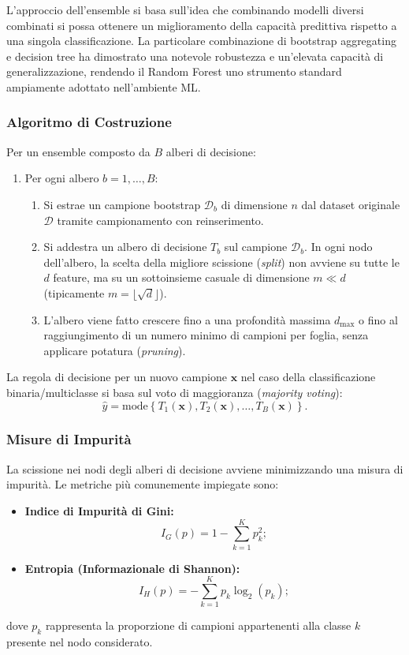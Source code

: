 L'approccio dell'ensemble si basa sull'idea che combinando modelli diversi combinati si possa ottenere un miglioramento della capacità predittiva rispetto a una singola classificazione. La particolare combinazione di bootstrap aggregating e decision tree ha dimostrato una notevole robustezza e un'elevata capacità di generalizzazione, rendendo il Random Forest uno strumento standard ampiamente adottato nell'ambiente ML.

\subsubsection{Algoritmo di Costruzione}
Per un ensemble composto da $B$ alberi di decisione:
\begin{enumerate}
    \item Per ogni albero $b = 1, \dots, B$:
    \begin{enumerate}
        \item Si estrae un campione bootstrap $\mathcal{D}_b$ di dimensione $n$ dal dataset originale $\mathcal{D}$ tramite campionamento con reinserimento.
        \item Si addestra un albero di decisione $T_b$ sul campione $\mathcal{D}_b$. In ogni nodo dell'albero, la scelta della migliore scissione (\textit{split}) non avviene su tutte le $d$ feature, ma su un sottoinsieme casuale di dimensione $m \ll d$ (tipicamente $m = \lfloor\sqrt{d}\rfloor$).
        \item L'albero viene fatto crescere fino a una profondità massima $d_{\max}$ o fino al raggiungimento di un numero minimo di campioni per foglia, senza applicare potatura (\textit{pruning}).
    \end{enumerate}
\end{enumerate}

La regola di decisione per un nuovo campione $\mathbf{x}$ nel caso della classificazione binaria/multiclasse si basa sul voto di maggioranza (\textit{majority voting}):
\begin{equation}
\hat{y} = \text{mode} \left\{ T_1(\mathbf{x}), T_2(\mathbf{x}), \dots, T_B(\mathbf{x}) \right\}.
\end{equation}

\subsubsection{Misure di Impurità}
La scissione nei nodi degli alberi di decisione avviene minimizzando una misura di impurità. Le metriche più comunemente impiegate sono:
\begin{itemize}
    \item \textbf{Indice di Impurità di Gini:}
    \begin{equation}
    I_G(p) = 1 - \sum_{k=1}^{K} p_k^2;
    \end{equation}
    \item \textbf{Entropia (Informazionale di Shannon):}
    \begin{equation}
    I_H(p) = -\sum_{k=1}^{K} p_k \log_2(p_k);
    \end{equation}
\end{itemize}
dove $p_k$ rappresenta la proporzione di campioni appartenenti alla classe $k$ presente nel nodo considerato.

